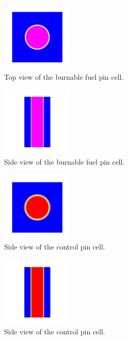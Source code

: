 \documentclass[twocolumn,a4paper,10pt]{article}
\begin{document}
\begin{figure}[t]
  \centering
  \includegraphics[width=0.3\textwidth]{../Pictures/Burnablefuelrods_plot_xy.png}
  \caption{Top view of the burnable fuel pin cell.}
  \label{fig:burnfuel_xy}
\end{figure}

\begin{figure}[ht]
  \centering
  \includegraphics[width=0.3\textwidth]{../Pictures/Burnablefuelrods_plot_yz.png}
  \caption{Side view of the burnable fuel pin cell.}
  \label{fig:burnfuel_yz}
\end{figure}

\begin{figure}[b]
  \centering
  \includegraphics[width=0.3\textwidth]{../Pictures/Controlrods_plot_xy.png}
  \caption{Side view of the control pin cell.}
  \label{fig:controlpin_xy}
\end{figure}

\begin{figure}[t]
  \centering
  \includegraphics[width=0.3\textwidth]{../Pictures/Controlrods_plot_yz.png}
  \caption{Side view of the control pin cell.}
  \label{fig:controlpin_yz}
\end{figure}
\end{document}
